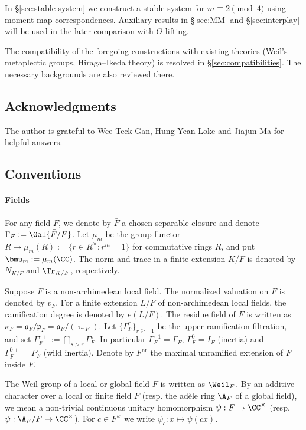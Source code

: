 \documentclass[a4paper,10pt]{article}
\begin{document}
In \S\ref{sec:stable-system} we construct a stable system for $m \equiv 2 \pmod 4$ using moment map correspondences. Auxiliary results in \S\ref{sec:MM} and \S\ref{sec:interplay} will be used in the later comparison with $\Theta$-lifting.

The compatibility of the foregoing constructions with existing theories (Weil's metaplectic groups, Hiraga--Ikeda theory) is resolved in \S\ref{sec:compatibilities}. The necessary backgrounds are also reviewed there.

\subsection*{Acknowledgments}
The author is grateful to Wee Teck Gan, Hung Yean Loke and Jiajun Ma for helpful answers.

\subsection*{Conventions}
\paragraph{Fields}
For any field $F$, we denote by $\bar{F}$ a chosen separable closure and denote $\Gamma_F := \Gal{\bar{F}/F}$. Let $\mu_m$ be the group functor  $R \mapsto \mu_m(R) := \{r \in R^\times: r^m=1 \}$ for commutative rings $R$, and put $\bmu_m := \mu_m(\CC)$. The norm and trace in a finite extension $K/F$ is denoted by $N_{K/F}$ and $\Tr_{K/F}$, respectively.

Suppose $F$ is a non-archimedean local field. The normalized valuation on $F$ is denoted by $v_F$. For a finite extension $L/F$ of non-archimedean local fields, the ramification degree is denoted by $e(L/F)$. The residue field of $F$ is written as $\kappa_F = \mathfrak{o}_F/\mathfrak{p}_F = \mathfrak{o}_F/(\varpi_F)$. Let $\{ \Gamma_F^r \}_{r \geq -1}$ be the upper ramification filtration, and set $\Gamma_F^{r+} := \bigcap_{s > r} \Gamma_F^s$. In particular $\Gamma_F^{-1} = \Gamma_F$, $\Gamma_F^0 = I_F$ (inertia) and $\Gamma_F^{0+} = P_F$ (wild inertia). Denote by $F^\text{nr}$ the maximal unramified extension of $F$ inside $\bar{F}$.

The Weil group of a local or global field $F$ is written as $\Weil_F$. By an additive character over a local or finite field $F$ (resp. the adèle ring $\A_F$ of a global field), we mean a non-trivial continuous unitary homomorphism $\psi: F \to \CC^\times$ (resp. $\psi: \A_F/F \to \CC^\times$). For $c \in F^\times$ we write $\psi_c: x \mapsto \psi(cx)$. 
\end{document}
